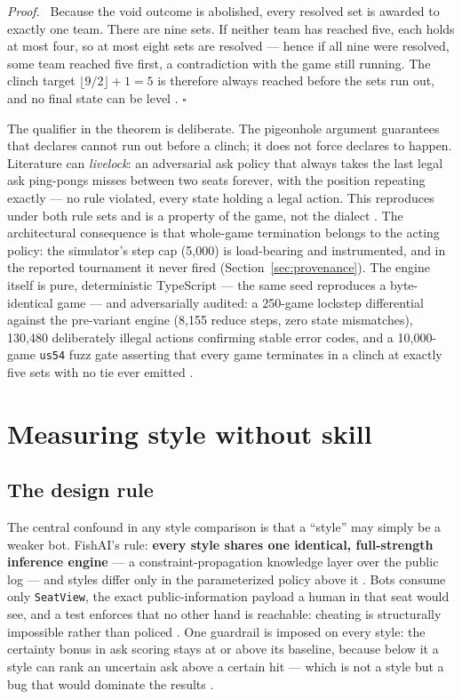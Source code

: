 \documentclass[11pt]{article}
\newenvironment{proofenv}{\noindent\textit{Proof.}\ }{\hfill$\square$\par\medskip}
\newcommand{\code}[1]{\texttt{#1}}
\newcommand{\usff}{\code{us54}}
\begin{document}
\begin{proofenv}
Because the void outcome is abolished, every resolved set is awarded to exactly one team.
There are nine sets. If neither team has reached five, each holds at most four, so at most
eight sets are resolved --- hence if all nine were resolved, some team reached five first, a
contradiction with the game still running. The clinch target $\lfloor 9/2 \rfloor + 1 = 5$ is
therefore always reached before the sets run out, and no final state can be level
\cite{rules}.
\end{proofenv}

The qualifier in the theorem is deliberate. The pigeonhole argument guarantees that declares
cannot run out before a clinch; it does not force declares to happen. Literature can
\emph{livelock}: an adversarial ask policy that always takes the last legal ask ping-pongs
misses between two seats forever, with the position repeating exactly --- no rule violated,
every state holding a legal action. This reproduces under both rule sets and is a property of
the game, not the dialect \cite{rules}. The architectural consequence is that whole-game
termination belongs to the acting policy: the simulator's step cap (5{,}000) is load-bearing
and instrumented, and in the reported tournament it never fired
(Section~\ref{sec:provenance}). The engine itself is pure, deterministic TypeScript --- the
same seed reproduces a byte-identical game --- and adversarially audited: a 250-game lockstep
differential against the pre-variant engine (8{,}155 reduce steps, zero state mismatches),
130{,}480 deliberately illegal actions confirming stable error codes, and a 10{,}000-game
\usff{} fuzz gate asserting that every game terminates in a clinch at exactly five sets with
no tie ever emitted \cite{repo}.

\section{Measuring style without skill}
\label{sec:style}

\subsection{The design rule}

The central confound in any style comparison is that a ``style'' may simply be a weaker bot.
FishAI's rule: \textbf{every style shares one identical, full-strength inference engine} ---
a constraint-propagation knowledge layer over the public log --- and styles differ only in the
parameterized policy above it \cite{botlab}. Bots consume only \code{SeatView}, the exact
public-information payload a human in that seat would see, and a test enforces that no other
hand is reachable: cheating is structurally impossible rather than policed \cite{repo}. One
guardrail is imposed on every style: the certainty bonus in ask scoring stays at or above its
baseline, because below it a style can rank an uncertain ask above a certain hit --- which is
not a style but a bug that would dominate the results \cite{styles}.
\end{document}
